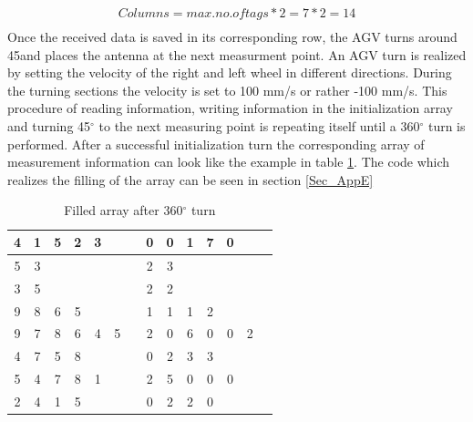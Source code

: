 \begin{align}
Columns = max. no. of  tags * 2 = 7 * 2 = 14\\
\end{align}
Once the received data is saved in its corresponding row, the AGV turns around 45\textdegree  and places the antenna at the next measurment point. An AGV turn is realized by setting the velocity of the right and left wheel in different directions. During the turning sections the velocity is set to 100 mm/s or rather -100 mm/s. 
This procedure of reading information, writing information in the initialization array and turning 45$^\circ$  to the next measuring point is repeating itself until a 360$^\circ$  turn is performed. After a successful initialization turn the corresponding array of measurement information can look like the example in table \ref{Init_Array}. The code which realizes the filling of the array can be seen in section \ref{Sec_AppE}
\begin{table}[!htbp]
\centering
\begin{tabular}{|c|c|c|c|c|c|c|c|c|c|c|c|c|c|}
\hline
4&1&5&2&3&&&0&0&1&7&0&&  \\ \hline
5&3&&&&&&2&3&&&&&  \\ \hline
3&5&&&&&&2&2&&&&&  \\ \hline
9&8&6&5&&&&1&1&1&2&&&  \\ \hline
9&7&8&6&4&5&&2&0&6&0&0&2&  \\ \hline
4&7&5&8&&&&0&2&3&3&&&  \\ \hline
5&4&7&8&1&&&2&5&0&0&0&&  \\ \hline
2&4&1&5&&&&0&2&2&0&&&  \\ \hline
\end{tabular}
\caption{Filled array after 360$^\circ$ turn}
\label{Init_Array}
\end{table}\\


